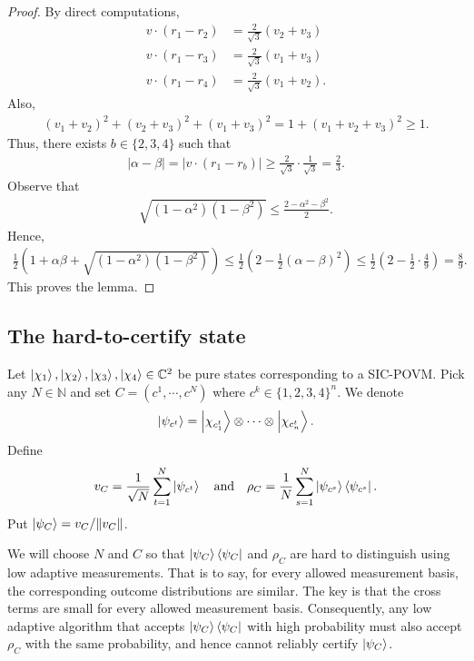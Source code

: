\begin{proof}
By direct computations,
\begin{align*}
v\cdot\left(r_1-r_2\right)&=\frac{2}{\sqrt{3}}\left(v_2+v_3\right)\\
v\cdot\left(r_1-r_3\right)&=\frac{2}{\sqrt{3}}\left(v_1+v_3\right)\\
v\cdot\left(r_1-r_4\right)&=\frac{2}{\sqrt{3}}\left(v_1+v_2\right).
\end{align*}
Also,
\begin{align*}
\left(v_1+v_2\right)^2+\left(v_2+v_3\right)^2+\left(v_1+v_3\right)^2=1+\left(v_1+v_2+v_3\right)^2\ge1.
\end{align*}
Thus, there exists $b\in\{2,3,4\}$ such that
\begin{align*}
|\alpha-\beta|=\left|v\cdot\left(r_1-r_b\right)\right|\ge\frac{2}{\sqrt{3}}\cdot\frac{1}{\sqrt{3}}=\frac{2}{3}.
\end{align*}
Observe that
\begin{align*}
\sqrt{\left(1-\alpha^2\right)\left(1-\beta^2\right)}\le\frac{2-\alpha^2-\beta^2}{2}.
\end{align*}
Hence,
\begin{align*}
\frac{1}{2}\left(1+\alpha\beta+\sqrt{\left(1-\alpha^2\right)\left(1-\beta^2\right)}\right)\le\frac{1}{2}\left(2-\frac{1}{2}\left(\alpha-\beta\right)^2\right)\le\frac{1}{2}\left(2-\frac{1}{2}\cdot\frac{4}{9}\right)=\frac{8}{9}.
\end{align*}
This proves the lemma.
\end{proof}

\subsection{The hard-to-certify state}
Let $\ket{\chi_1},\ket{\chi_2},\ket{\chi_3},\ket{\chi_4}\in\mathbb{C}^2$ be pure states corresponding to a SIC-POVM.
Pick any $N\in\mathbb{N}$ and set $C=(c^1,\cdots,c^N)$ where $c^k\in\{1,2,3,4\}^n$.
We denote
\begin{align*}
\ket{\psi_{c^t}}=\ket{\chi_{c^t_1}}\otimes\cdots\otimes\ket{\chi_{c^t_n}}.
\end{align*}
Define
\begin{align*}
v_C=\frac{1}{\sqrt{N}}\sum_{t=1}^N\ket{\psi_{c^t}}\quad\text{and}\quad\rho_C=\frac{1}{N}\sum_{s=1}^N\ket{\psi_{c^s}}\bra{\psi_{c^s}}.
\end{align*}
Put $\ket{\psi_C}={v_C}/{\|v_C\|}$.

We will choose $N$ and $C$ so that $\ket{\psi_C}\bra{\psi_C}$ and $\rho_C$ are hard to distinguish using low adaptive measurements.
That is to say, for every allowed measurement basis, the corresponding outcome distributions are similar.
The key is that the cross terms are small for every allowed measurement basis.
Consequently, any low adaptive algorithm that accepts $\ket{\psi_C}\bra{\psi_C}$ with high probability must also accept $\rho_C$ with the same probability, and hence cannot reliably certify $\ket{\psi_C}$.

